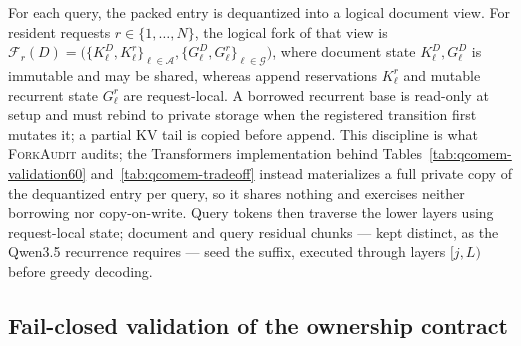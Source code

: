 \documentclass{article}
\newcommand{\method}{\textsc{ForkAudit}}
\begin{document}
For each query, the packed entry is dequantized into a logical document view.
For resident requests \(r\in\{1,\ldots,N\}\), the logical fork of that view is
\(\mathcal{F}_r(D)=\bigl(\{K^D_\ell,K^r_\ell\}_{\ell\in\mathcal A},
\{G^D_\ell,G^r_\ell\}_{\ell\in\mathcal G}\bigr)\),
where document state \(K^D_\ell,G^D_\ell\) is immutable and may be shared,
whereas append reservations \(K^r_\ell\) and mutable recurrent state
\(G^r_\ell\) are request-local.  A borrowed recurrent base is read-only at
setup and must rebind to private storage when the registered transition first
mutates it; a partial KV tail is copied before append.  This discipline is what
\method{} audits; the Transformers implementation behind
Tables~\ref{tab:qcomem-validation60} and~\ref{tab:qcomem-tradeoff} instead
materializes a full private copy of the dequantized entry per query, so it
shares nothing and exercises neither borrowing nor copy-on-write.  Query tokens then traverse the lower layers using request-local state; document
and query residual chunks --- kept distinct, as the Qwen3.5 recurrence requires
--- seed the suffix, executed through layers $[j,L)$ before greedy decoding.

\subsection{Fail-closed validation of the ownership contract}
\label{sec:contract}
\end{document}
